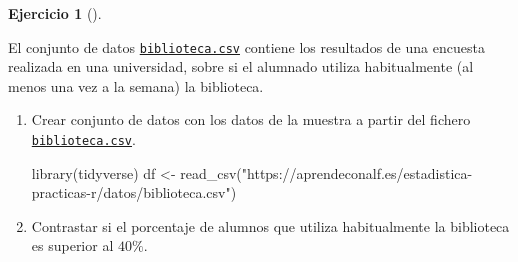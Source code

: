 \documentclass[
  a4paper,
]{scrreport}
\newenvironment{Shaded}{\begin{snugshade}}{\end{snugshade}}
\newcommand{\FunctionTok}[1]{\textcolor[rgb]{0.28,0.35,0.67}{#1}}
\newcommand{\NormalTok}[1]{\textcolor[rgb]{0.00,0.23,0.31}{#1}}
\newcommand{\OtherTok}[1]{\textcolor[rgb]{0.00,0.23,0.31}{#1}}
\newcommand{\StringTok}[1]{\textcolor[rgb]{0.13,0.47,0.30}{#1}}
\theoremstyle{definition}
\newtheorem{exercise}{Ejercicio}[chapter]
\theoremstyle{remark}
\begin{document}
\begin{exercise}[]\protect\hypertarget{exr-contraste-hipotesis-proporcion-uso-biblioteca}{}\label{exr-contraste-hipotesis-proporcion-uso-biblioteca}

El conjunto de datos
\href{https://aprendeconalf.es/estadistica-practicas-r/datos/biblioteca.csv}{\texttt{biblioteca.csv}}
contiene los resultados de una encuesta realizada en una universidad,
sobre si el alumnado utiliza habitualmente (al menos una vez a la
semana) la biblioteca.

\begin{enumerate}
\def\labelenumi{\alph{enumi}.}
\item
  Crear conjunto de datos con los datos de la muestra a partir del
  fichero
  \href{https://aprendeconalf.es/estadistica-practicas-r/datos/biblioteca.csv}{\texttt{biblioteca.csv}}.

  \begin{tcolorbox}[enhanced jigsaw, colframe=quarto-callout-tip-color-frame, toprule=.15mm, bottomtitle=1mm, breakable, opacitybacktitle=0.6, toptitle=1mm, colback=white, bottomrule=.15mm, title=\textcolor{quarto-callout-tip-color}{\faLightbulb}\hspace{0.5em}{Solución}, arc=.35mm, left=2mm, titlerule=0mm, rightrule=.15mm, coltitle=black, leftrule=.75mm, opacityback=0, colbacktitle=quarto-callout-tip-color!10!white]

\begin{Shaded}
\begin{Highlighting}[]
\FunctionTok{library}\NormalTok{(tidyverse)}
\NormalTok{df }\OtherTok{\textless{}{-}} \FunctionTok{read\_csv}\NormalTok{(}\StringTok{"https://aprendeconalf.es/estadistica{-}practicas{-}r/datos/biblioteca.csv"}\NormalTok{)}
\end{Highlighting}
\end{Shaded}

  \end{tcolorbox}
\item
  Contrastar si el porcentaje de alumnos que utiliza habitualmente la
  biblioteca es superior al \(40\%\).

  \begin{tcolorbox}[enhanced jigsaw, colframe=quarto-callout-note-color-frame, toprule=.15mm, bottomtitle=1mm, breakable, opacitybacktitle=0.6, toptitle=1mm, colback=white, bottomrule=.15mm, title=\textcolor{quarto-callout-note-color}{\faInfo}\hspace{0.5em}{Ayuda}, arc=.35mm, left=2mm, titlerule=0mm, rightrule=.15mm, coltitle=black, leftrule=.75mm, opacityback=0, colbacktitle=quarto-callout-note-color!10!white]


\end{tcolorbox}
\end{enumerate}
\end{exercise}
\end{document}
